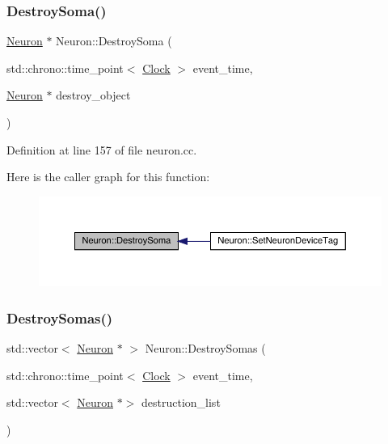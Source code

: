 \subsubsection{\texorpdfstring{Destroy\+Soma()}{DestroySoma()}}
{\footnotesize\ttfamily \hyperlink{class_neuron}{Neuron} $\ast$ Neuron\+::\+Destroy\+Soma (\begin{DoxyParamCaption}\item[{std\+::chrono\+::time\+\_\+point$<$ \hyperlink{universe_8h_a0ef8d951d1ca5ab3cfaf7ab4c7a6fd80}{Clock} $>$}]{event\+\_\+time,  }\item[{\hyperlink{class_neuron}{Neuron} $\ast$}]{destroy\+\_\+object }\end{DoxyParamCaption})}



Definition at line 157 of file neuron.\+cc.

Here is the caller graph for this function\+:
\nopagebreak
\begin{figure}[H]
\begin{center}
\leavevmode
\includegraphics[width=350pt]{class_neuron_a6ff7510f73e29c31003b016bdcb4a70e_icgraph}
\end{center}
\end{figure}
\mbox{\label{class_neuron_a32b3a98eec58dc66481a2b877a7592cb}} 
\subsubsection{\texorpdfstring{Destroy\+Somas()}{DestroySomas()}}
{\footnotesize\ttfamily std\+::vector$<$ \hyperlink{class_neuron}{Neuron} $\ast$ $>$ Neuron\+::\+Destroy\+Somas (\begin{DoxyParamCaption}\item[{std\+::chrono\+::time\+\_\+point$<$ \hyperlink{universe_8h_a0ef8d951d1ca5ab3cfaf7ab4c7a6fd80}{Clock} $>$}]{event\+\_\+time,  }\item[{std\+::vector$<$ \hyperlink{class_neuron}{Neuron} $\ast$$>$}]{destruction\+\_\+list }\end{DoxyParamCaption})}



